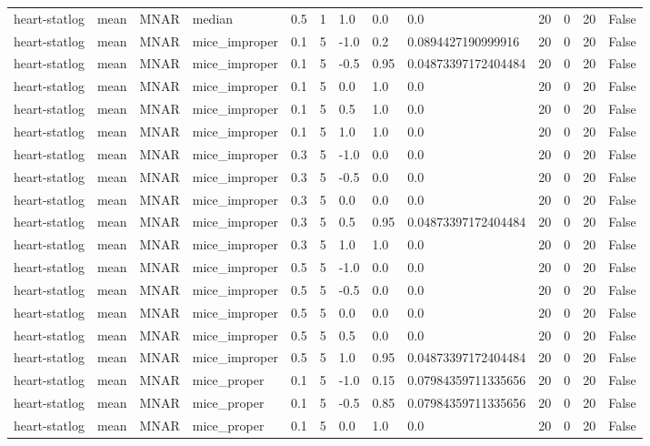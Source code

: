 \begin{tabular}{lllllllllllll}
heart-statlog & mean & MNAR & median & 0.5 & 1 & 1.0 & 0.0 & 0.0 & 20 & 0 & 20 & False \\
heart-statlog & mean & MNAR & mice\_improper & 0.1 & 5 & -1.0 & 0.2 & 0.0894427190999916 & 20 & 0 & 20 & False \\
heart-statlog & mean & MNAR & mice\_improper & 0.1 & 5 & -0.5 & 0.95 & 0.04873397172404484 & 20 & 0 & 20 & False \\
heart-statlog & mean & MNAR & mice\_improper & 0.1 & 5 & 0.0 & 1.0 & 0.0 & 20 & 0 & 20 & False \\
heart-statlog & mean & MNAR & mice\_improper & 0.1 & 5 & 0.5 & 1.0 & 0.0 & 20 & 0 & 20 & False \\
heart-statlog & mean & MNAR & mice\_improper & 0.1 & 5 & 1.0 & 1.0 & 0.0 & 20 & 0 & 20 & False \\
heart-statlog & mean & MNAR & mice\_improper & 0.3 & 5 & -1.0 & 0.0 & 0.0 & 20 & 0 & 20 & False \\
heart-statlog & mean & MNAR & mice\_improper & 0.3 & 5 & -0.5 & 0.0 & 0.0 & 20 & 0 & 20 & False \\
heart-statlog & mean & MNAR & mice\_improper & 0.3 & 5 & 0.0 & 0.0 & 0.0 & 20 & 0 & 20 & False \\
heart-statlog & mean & MNAR & mice\_improper & 0.3 & 5 & 0.5 & 0.95 & 0.04873397172404484 & 20 & 0 & 20 & False \\
heart-statlog & mean & MNAR & mice\_improper & 0.3 & 5 & 1.0 & 1.0 & 0.0 & 20 & 0 & 20 & False \\
heart-statlog & mean & MNAR & mice\_improper & 0.5 & 5 & -1.0 & 0.0 & 0.0 & 20 & 0 & 20 & False \\
heart-statlog & mean & MNAR & mice\_improper & 0.5 & 5 & -0.5 & 0.0 & 0.0 & 20 & 0 & 20 & False \\
heart-statlog & mean & MNAR & mice\_improper & 0.5 & 5 & 0.0 & 0.0 & 0.0 & 20 & 0 & 20 & False \\
heart-statlog & mean & MNAR & mice\_improper & 0.5 & 5 & 0.5 & 0.0 & 0.0 & 20 & 0 & 20 & False \\
heart-statlog & mean & MNAR & mice\_improper & 0.5 & 5 & 1.0 & 0.95 & 0.04873397172404484 & 20 & 0 & 20 & False \\
heart-statlog & mean & MNAR & mice\_proper & 0.1 & 5 & -1.0 & 0.15 & 0.07984359711335656 & 20 & 0 & 20 & False \\
heart-statlog & mean & MNAR & mice\_proper & 0.1 & 5 & -0.5 & 0.85 & 0.07984359711335656 & 20 & 0 & 20 & False \\
heart-statlog & mean & MNAR & mice\_proper & 0.1 & 5 & 0.0 & 1.0 & 0.0 & 20 & 0 & 20 & False \\

\end{tabular}
